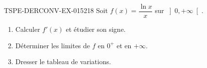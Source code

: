 \begin{exercice}{TSPE-DERCONV-EX-015}{2}{18}
Soit $f(x) = \dfrac{\ln x}{x}$ sur $\left]0, +\infty\right[$.
\begin{enumerate}
  \item Calculer $f'(x)$ et étudier son signe.
  \item Déterminer les limites de $f$ en $0^+$ et en $+\infty$.
  \item Dresser le tableau de variations.
\end{enumerate}

\end{exercice}
